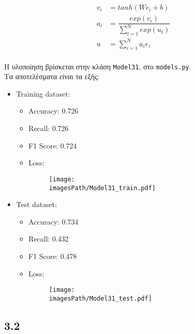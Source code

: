 \documentclass[a4paper, 12pt]{article}
\newcommand{\imagesPath}{results}
\newcommand{\myWidth}{0.8\linewidth}
\begin{document}
        \begin{align*}
            v_i &= tanh(We_i+b) \\
            a_i &= \dfrac{exp(v_i)}{\sum_{t=1}^{N}exp(u_t)}\\
            u   &= \sum_{i=1}^{N}a_ie_i\\
        \end{align*}
        
        Η υλοποίηση βρίσκεται στην κλάση \verb|Model31|, στο \verb|models.py|. \\
        
        Τα αποτελέσματα είναι τα εξής:
        
        \begin{itemize}
            \item Training dataset:
                \begin{itemize}
                    \item Accuracy: 0.726
                    \item Recall: 0.726
                    \item F1 Score: 0.724
                    \item Loss:
                        \begin{figure}[H]
                            \centering
                            \texttt{[image: \\imagesPath/Model31\_train.pdf]}
                        \end{figure}
                \end{itemize}
                
            \item Test dataset:
                \begin{itemize}
                    \item Accuracy: 0.734
                    \item Recall: 0.432
                    \item F1 Score: 0.478
                    \item Loss:
                        \begin{figure}[H]
                            \centering
                            \texttt{[image: \\imagesPath/Model31\_test.pdf]}
                        \end{figure}
                \end{itemize}
        \end{itemize}

    \subsection*{3.2}
\end{document}
